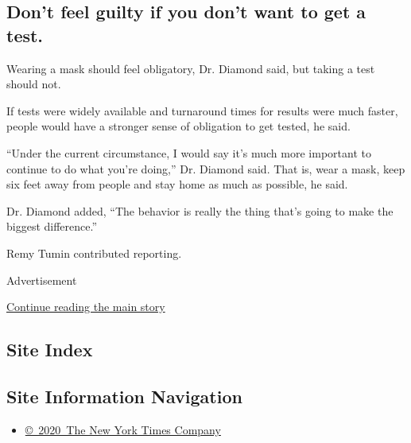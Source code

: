 \hypertarget{dont-feel-guilty-if-you-dont-want-to-get-a-test}{%
\subsection{Don't feel guilty if you don't want to get a
test.}\label{dont-feel-guilty-if-you-dont-want-to-get-a-test}}

Wearing a mask should feel obligatory, Dr. Diamond said, but taking a
test should not.

If tests were widely available and turnaround times for results were
much faster, people would have a stronger sense of obligation to get
tested, he said.

``Under the current circumstance, I would say it's much more important
to continue to do what you're doing,'' Dr. Diamond said. That is, wear a
mask, keep six feet away from people and stay home as much as possible,
he said.

Dr. Diamond added, ``The behavior is really the thing that's going to
make the biggest difference.''

Remy Tumin contributed reporting.

Advertisement

\protect\hyperlink{after-bottom}{Continue reading the main story}

\hypertarget{site-index}{%
\subsection{Site Index}\label{site-index}}

\hypertarget{site-information-navigation}{%
\subsection{Site Information
Navigation}\label{site-information-navigation}}

\begin{itemize}
\tightlist
\item
  \href{https://help.nytimes3xbfgragh.onion/hc/en-us/articles/115014792127-Copyright-notice}{©~2020~The
  New York Times Company}
\end{itemize}


